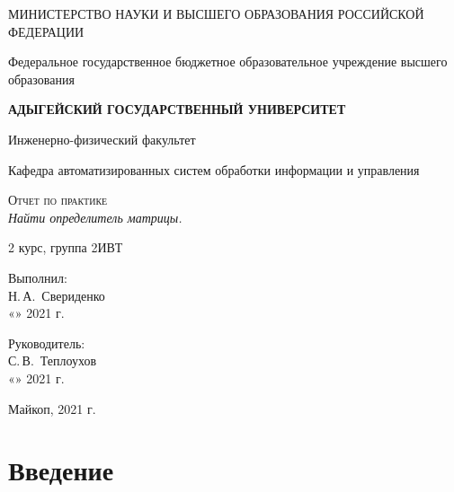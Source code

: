\documentclass[12pt,a4paper]{scrartcl}
\begin{document}
	\begin{titlepage}
		\begin{center}
			\large
			МИНИСТЕРСТВО НАУКИ И ВЫСШЕГО ОБРАЗОВАНИЯ РОССИЙСКОЙ ФЕДЕРАЦИИ
			
			Федеральное государственное бюджетное образовательное учреждение высшего образования
			
			\textbf{АДЫГЕЙСКИЙ ГОСУДАРСТВЕННЫЙ УНИВЕРСИТЕТ}
			\vspace{0.25cm}
			
			Инженерно-физический факультет
			
			Кафедра автоматизированных систем обработки информации и управления
			\vfill

			\vfill
			
			\textsc{Отчет по практике}\\[5mm]
			
			{\LARGE \textit{Найти определитель матрицы.}}
			\bigskip
			
			2 курс, группа 2ИВТ
		\end{center}
		\vfill
		
		\newlength{\ML}
		\hfill\begin{minipage}{0.5\textwidth}
			Выполнил:\\
			\underline{\hspace{\ML}} Н.\,А.~Свериденко\\
			«\underline{\hspace{0.7cm}}» \underline{\hspace{2cm}} 2021 г.
		\end{minipage}%
		\bigskip
		
		\hfill\begin{minipage}{0.5\textwidth}
			Руководитель:\\
			\underline{\hspace{\ML}} С.\,В.~Теплоухов\\
			«\underline{\hspace{0.7cm}}» \underline{\hspace{2cm}} 2021 г.
		\end{minipage}%
		\vfill
		
		\begin{center}
			Майкоп, 2021 г.
		\end{center}
	\end{titlepage}
	\section{Введение}
\label{sec:intro}
\end{document}
